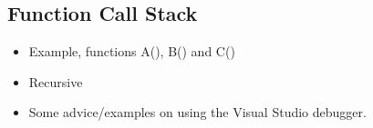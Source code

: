 \documentclass[11pt]{article}
\begin{document}
\subsection{Function Call Stack}
\label{sec-3-3}
\begin{itemize}
\item Example, functions A(), B() and C()
\item Recursive
\item Some advice/examples on using the Visual Studio debugger.
\end{itemize}
\end{document}
